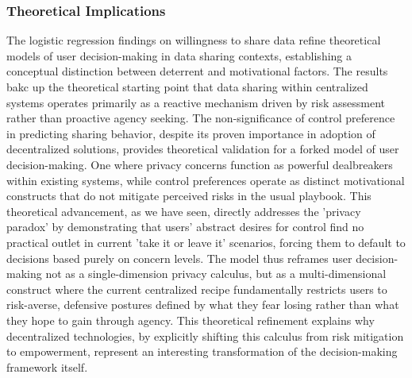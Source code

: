 	\subsubsection{Theoretical Implications}
	The logistic regression findings on willingness to share data refine theoretical models of user decision-making in data sharing contexts, establishing a conceptual distinction between deterrent and motivational factors. The results bakc up the theoretical starting point that data sharing within centralized systems operates primarily as a reactive mechanism driven by risk assessment rather than proactive agency seeking. The non-significance of control preference in predicting sharing behavior, despite its proven importance in adoption of decentralized solutions, provides theoretical validation for a forked model of user decision-making. One where privacy concerns function as powerful dealbreakers within existing systems, while control preferences operate as distinct motivational constructs that do not mitigate perceived risks in the usual playbook. This theoretical advancement, as we have seen, directly addresses the 'privacy paradox' by demonstrating that users' abstract desires for control find no practical outlet in current 'take it or leave it' scenarios, forcing them to default to decisions based purely on concern levels. The model thus reframes user decision-making not as a single-dimension privacy calculus, but as a multi-dimensional construct where the current centralized recipe fundamentally restricts users to risk-averse, defensive postures defined by what they fear losing rather than what they hope to gain through agency. This theoretical refinement explains why decentralized technologies, by explicitly shifting this calculus from risk mitigation to empowerment, represent an interesting transformation of the decision-making framework itself.

